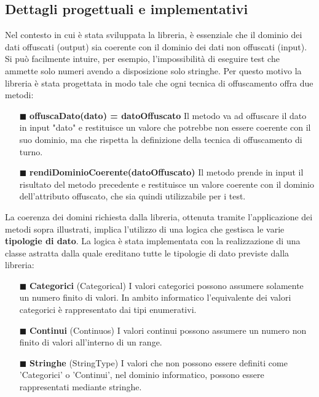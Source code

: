 \subsection{Dettagli progettuali e implementativi}
Nel contesto in cui è stata sviluppata la libreria, è essenziale che il dominio dei dati offuscati (output) sia coerente con il dominio dei dati non offuscati (input). Si può facilmente intuire, per esempio, l'impossibilità di eseguire test che ammette solo numeri avendo a disposizione solo stringhe. Per questo motivo la libreria è stata progettata in modo tale che ogni tecnica di offuscamento offra due metodi:
\begin{itemize}[nosep]
\item [$\blacksquare$] \textbf{offuscaDato(dato) = datoOffuscato} \newline
Il metodo va ad offuscare il dato in input "dato" e restituisce un valore che potrebbe non essere coerente con il suo dominio, ma che rispetta la definizione della tecnica di offuscamento di turno.
\item [$\blacksquare$] \textbf{rendiDominioCoerente(datoOffuscato)} \newline
Il metodo prende in input il risultato del metodo precedente e restituisce un valore coerente con il dominio dell’attributo offuscato, che sia quindi utilizzabile per i test.
\end{itemize}
\bigskip
\noindent La coerenza dei domini richiesta dalla libreria, ottenuta tramite l'applicazione dei metodi sopra illustrati, implica l'utilizzo di una logica che gestisca le varie \textbf{tipologie di dato}. La logica è stata implementata con la realizzazione di una classe astratta dalla quale ereditano tutte le tipologie di dato previste dalla libreria:
\begin{itemize}[nosep]
\item [$\blacksquare$] \textbf{Categorici} (Categorical) \newline
I valori categorici possono assumere solamente un numero finito di valori. In ambito informatico l’equivalente dei valori categorici è rappresentato dai tipi enumerativi.
\item [$\blacksquare$] \textbf{Continui} (Continuos)\newline
I valori continui possono assumere un numero non finito di valori all’interno di un range. 
\item [$\blacksquare$] \textbf{Stringhe} (StringType)\newline
I valori che non possono essere definiti come 'Categorici' o 'Continui', nel dominio informatico, possono essere rappresentati mediante stringhe.
\end{itemize}


